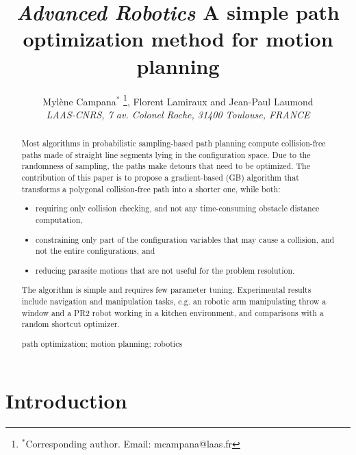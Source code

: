 \documentclass{tADR2e}
\begin{document}
\graphicspath{{images/}}

   

\title{{\itshape Advanced Robotics} A simple path optimization method for motion planning }	

\author{Myl\`{e}ne Campana$^{\ast}$ \thanks{$^\ast$Corresponding author. Email: mcampana@laas.fr}, Florent Lamiraux and Jean-Paul Laumond
\\\vspace{6pt}
{\em{LAAS-CNRS, 7 av. Colonel Roche, 31400 Toulouse, FRANCE}}
}
\maketitle

\begin{abstract}
Most algorithms in probabilistic sampling-based path planning compute 
collision-free paths made of straight line segments lying in the configuration 
space. Due
to the randomness of sampling, the paths make detours that need to be optimized.
The contribution of this paper is to propose a gradient-based (GB) algorithm that
transforms a polygonal collision-free path into a shorter one, while both:
\begin{itemize}
\item requiring only collision checking, and not any time-consuming obstacle distance computation,
\item constraining only part of the configuration variables that may cause a 
collision, and not the entire configurations, and
\item reducing parasite motions that are not useful for the problem resolution.
\end{itemize}
The algorithm is simple and requires few parameter tuning. Experimental
results include navigation and manipulation tasks, e.g. an robotic arm 
manipulating throw a window and a PR2 robot working in a kitchen environment, 
and comparisons with a random shortcut optimizer.

\medskip

\begin{keywords}path optimization; motion planning; robotics
\end{keywords}\medskip

\end{abstract}


\section{Introduction}
\end{document}
